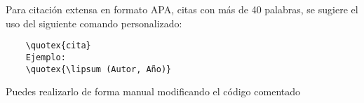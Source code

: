 Para citación extensa en formato APA, citas con más de 40 palabras, se sugiere el uso del siguiente comando personalizado:

\begin{verbatim}
    \quotex{cita}
    Ejemplo:
    \quotex{\lipsum (Autor, Año)}
\end{verbatim}


Puedes realizarlo de forma manual modificando el código comentado



\newpage